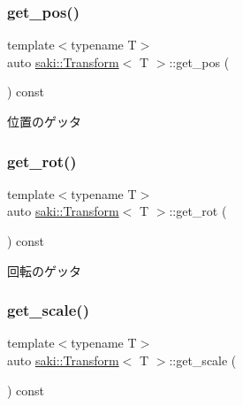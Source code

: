 \subsubsection{\texorpdfstring{get\+\_\+pos()}{get\_pos()}}
{\footnotesize\ttfamily template$<$typename T$>$ \\
auto \mbox{\hyperlink{classsaki_1_1_transform}{saki\+::\+Transform}}$<$ T $>$\+::get\+\_\+pos (\begin{DoxyParamCaption}{ }\end{DoxyParamCaption}) const\hspace{0.3cm}{\ttfamily [inline]}}



位置のゲッタ 

\mbox{\label{classsaki_1_1_transform_ab5a091567c4f9f3040c0f843156d8bce}} 
\subsubsection{\texorpdfstring{get\+\_\+rot()}{get\_rot()}}
{\footnotesize\ttfamily template$<$typename T$>$ \\
auto \mbox{\hyperlink{classsaki_1_1_transform}{saki\+::\+Transform}}$<$ T $>$\+::get\+\_\+rot (\begin{DoxyParamCaption}{ }\end{DoxyParamCaption}) const\hspace{0.3cm}{\ttfamily [inline]}}



回転のゲッタ 

\mbox{\label{classsaki_1_1_transform_a0ec8a9193bf5b987a72ed732b8976cfb}} 
\subsubsection{\texorpdfstring{get\+\_\+scale()}{get\_scale()}}
{\footnotesize\ttfamily template$<$typename T$>$ \\
auto \mbox{\hyperlink{classsaki_1_1_transform}{saki\+::\+Transform}}$<$ T $>$\+::get\+\_\+scale (\begin{DoxyParamCaption}{ }\end{DoxyParamCaption}) const\hspace{0.3cm}{\ttfamily [inline]}}



